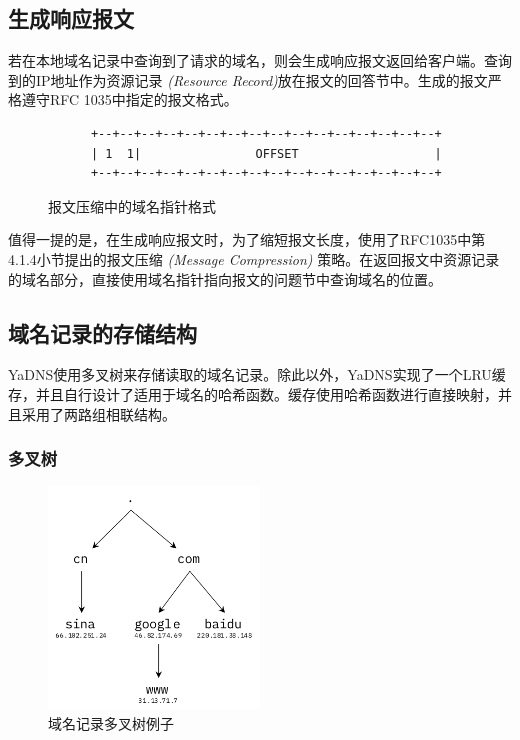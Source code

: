 \subsection{生成响应报文}

若在本地域名记录中查询到了请求的域名，则会生成响应报文返回给客户端。查询到的IP地址作为资源记录 \emph{(Resource Record)}放在报文的回答节中。生成的报文严格遵守RFC 1035中指定的报文格式。

\begin{figure}[t]
\centering
\begin{verbatim}
      +--+--+--+--+--+--+--+--+--+--+--+--+--+--+--+--+
      | 1  1|                OFFSET                   |
      +--+--+--+--+--+--+--+--+--+--+--+--+--+--+--+--+
\end{verbatim}
\caption{报文压缩中的域名指针格式}
\end{figure}

值得一提的是，在生成响应报文时，为了缩短报文长度，使用了RFC1035中第4.1.4小节提出的报文压缩 \emph{(Message Compression)} 策略。在返回报文中资源记录的域名部分，直接使用域名指针指向报文的问题节中查询域名的位置。

\subsection{域名记录的存储结构}

YaDNS使用多叉树来存储读取的域名记录。除此以外，YaDNS实现了一个LRU缓存，并且自行设计了适用于域名的哈希函数。缓存使用哈希函数进行直接映射，并且采用了两路组相联结构。

\subsubsection{多叉树}

\begin{figure}[h]
  \centering
  \includegraphics[width=0.5\textwidth]{figures/tree_example}
  \caption{域名记录多叉树例子}
  \label{fig:tree-example}
\end{figure}

